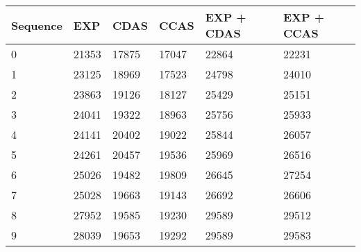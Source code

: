 \begin{center}
\begin{tabular}{|l|l|l|l|l|l}
\hline
Sequence & EXP & CDAS & CCAS & EXP + CDAS & EXP + CCAS \\
\hline
0 & 21353 & 17875 & 17047 & 22864 & 22231 \\
1 & 23125 & 18969 & 17523 & 24798 & 24010 \\
2 & 23863 & 19126 & 18127 & 25429 & 25151 \\
3 & 24041 & 19322 & 18963 & 25756 & 25933 \\
4 & 24141 & 20402 & 19022 & 25844 & 26057 \\
5 & 24261 & 20457 & 19536 & 25969 & 26516 \\
6 & 25026 & 19482 & 19809 & 26645 & 27254 \\
7 & 25028 & 19663 & 19143 & 26692 & 26606 \\
8 & 27952 & 19585 & 19230 & 29589 & 29512 \\
9 & 28039 & 19653 & 19292 & 29589 & 29583 \\
\hline
\end{tabular}
\end{center}
